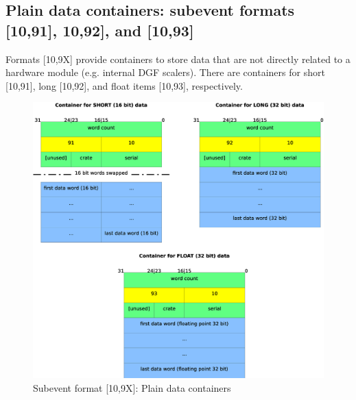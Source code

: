 \documentclass[10pt]{article}
\begin{document}
\subsection{Plain data containers: subevent formats [10,91], 10,92], and [10,93]}
Formats [10,9X] provide containers to store data that are not directly related to a hardware module
(e.g. internal DGF scalers).
There are containers for short [10,91], long [10,92], and float items [10,93], respectively.
\begin{figure}[H]
\centerline{\includegraphics[width=\linewidth]{MedSevt_Data_X}}
\caption{Subevent format [10,9X]: Plain data containers}
\label{MedSevt_Data_X}
\end{figure}
\newpage
\end{document}

